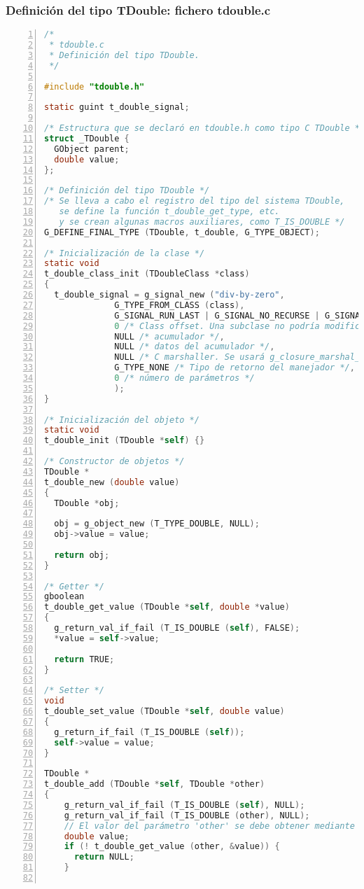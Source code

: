 \subsubsection{Definición del tipo \textsf{TDouble}: fichero \textsf{tdouble.c}}
\begin{lstlisting}[language=C, numbers=left]
/*
 * tdouble.c
 * Definición del tipo TDouble.
 */

#include "tdouble.h"

static guint t_double_signal;

/* Estructura que se declaró en tdouble.h como tipo C TDouble */
struct _TDouble {
  GObject parent;
  double value;
};

/* Definición del tipo TDouble */
/* Se lleva a cabo el registro del tipo del sistema TDouble,
   se define la función t_double_get_type, etc.
   y se crean algunas macros auxiliares, como T_IS_DOUBLE */
G_DEFINE_FINAL_TYPE (TDouble, t_double, G_TYPE_OBJECT);

/* Inicialización de la clase */
static void
t_double_class_init (TDoubleClass *class)
{
  t_double_signal = g_signal_new ("div-by-zero",
			  G_TYPE_FROM_CLASS (class),
			  G_SIGNAL_RUN_LAST | G_SIGNAL_NO_RECURSE | G_SIGNAL_NO_HOOKS,
			  0 /* Class offset. Una subclase no podría modificar el manejador de señal (manejador por defecto) */,
			  NULL /* acumulador */,
			  NULL /* datos del acumulador */,
			  NULL /* C marshaller. Se usará g_closure_marshal_generic() */,
			  G_TYPE_NONE /* Tipo de retorno del manejador */,
			  0 /* número de parámetros */
			  );
}

/* Inicialización del objeto */
static void
t_double_init (TDouble *self) {}

/* Constructor de objetos */
TDouble *
t_double_new (double value)
{
  TDouble *obj;
  
  obj = g_object_new (T_TYPE_DOUBLE, NULL);
  obj->value = value;
  
  return obj;
}

/* Getter */
gboolean
t_double_get_value (TDouble *self, double *value)
{
  g_return_val_if_fail (T_IS_DOUBLE (self), FALSE);
  *value = self->value;
  
  return TRUE;
}

/* Setter */
void
t_double_set_value (TDouble *self, double value)
{
  g_return_if_fail (T_IS_DOUBLE (self));
  self->value = value;
}

TDouble *
t_double_add (TDouble *self, TDouble *other)
{
    g_return_val_if_fail (T_IS_DOUBLE (self), NULL);
    g_return_val_if_fail (T_IS_DOUBLE (other), NULL);
    // El valor del parámetro 'other' se debe obtener mediante el método 'getter'
    double value;
    if (! t_double_get_value (other, &value)) {
      return NULL;
    }
    

\end{lstlisting}
